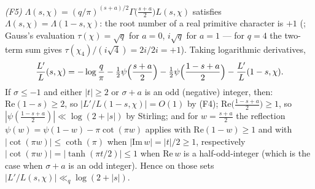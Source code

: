 \emph{(F5)} $\Lambda(s,\chi)=(q/\pi)^{(s+a)/2}
\Gamma\bigl(\tfrac{s+a}2\bigr)L(s,\chi)$
satisfies $\Lambda(s,\chi)=\Lambda(1-s,\chi)$: the root number of a
real primitive character is $+1$ (\cite[Chs.~2, 9]{Dav00}; Gauss's
evaluation $\tau(\chi)=\sqrt q$ for $a=0$, $i\sqrt q$ for $a=1$ ---
for $q=4$ the two-term sum gives $\tau(\chi_4)/(i\sqrt4)=2i/2i=+1$).
Taking logarithmic derivatives,
\[
\frac{L'}{L}(s,\chi)
=-\log\frac q\pi-\tfrac12\psi\Bigl(\frac{s+a}2\Bigr)
-\tfrac12\psi\Bigl(\frac{1-s+a}2\Bigr)-\frac{L'}{L}(1-s,\chi).
\]
If $\sigma\le-1$ and either $|t|\ge2$ or $\sigma+a$ is an odd
(negative) integer, then: $\mathrm{Re}(1-s)\ge2$, so
$|L'/L(1-s,\chi)|=O(1)$ by
(F4); $\mathrm{Re}\bigl(\frac{1-s+a}2\bigr)\ge1$, so
$|\psi(\frac{1-s+a}2)|\ll\log(2+|s|)$ by Stirling; and for
$w=\frac{s+a}2$ the reflection $\psi(w)=\psi(1-w)-\pi\cot(\pi w)$
applies with $\mathrm{Re}(1-w)\ge1$ and with $|\cot(\pi w)|\le
\coth(\pi)$ when $|\mathrm{Im}\,w|=|t|/2\ge1$, respectively
$|\cot(\pi w)|=|\tanh(\pi t/2)|\le1$ when $\mathrm{Re}\,w$ is a
half-odd-integer (which is the case when $\sigma+a$ is an odd
integer). Hence on those sets
$|L'/L(s,\chi)|\ll_q\log(2+|s|)$.

